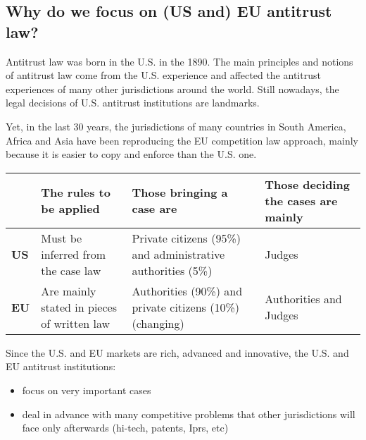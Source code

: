     \subsection{Why do we focus on (US and) EU antitrust law?}
    
        Antitrust law was born in the U.S. in the 1890. The main principles and notions of antitrust law come from the U.S. experience and affected the antitrust experiences of many other jurisdictions around the world. Still nowadays, the legal decisions of U.S. antitrust institutions are landmarks.
    
        Yet, in the last 30 years, the jurisdictions of many countries in South America, Africa and Asia have been reproducing the EU competition law approach, mainly because it is easier to copy and enforce than the U.S. one.
    
        
        \begin{table}[h]
            \centering
            \begin{tabular}{|p{1cm}|p{2.5cm}|p{2.5cm}|p{2.5cm}|}
                \hline
                 & \textbf{The rules to be applied} & \textbf{Those bringing a case are} & \textbf{Those deciding the cases are mainly}  \\
                \hline
                \textbf{US} & Must be inferred from the case law & Private citizens (95\%) and administrative authorities (5\%) & Judges \\
                \hline
                \textbf{EU} & Are mainly stated in pieces of written law & Authorities (90\%) and private citizens (10\%) (changing) & Authorities and Judges \\
                \hline
            \end{tabular}
            \label{tab:my_label}
        \end{table}

        Since the U.S. and EU markets are rich, advanced and innovative, the U.S. and EU antitrust institutions:
            \begin{itemize}
                \item focus on very important cases
                \item deal in advance with many competitive problems that other jurisdictions will face only afterwards (hi-tech, patents, Iprs, etc)
            \end{itemize}
    
